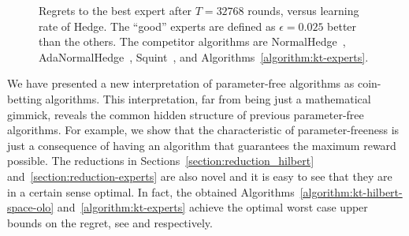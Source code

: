 \begin{figure}[t]
\centering
{}
\caption{\footnotesize{Regrets to the best expert after $T = 32768$ rounds, versus learning rate of Hedge. The ``good'' experts are defined as $\epsilon=0.025$ better than the others. The competitor algorithms are NormalHedge~\cite{Chaudhuri-Freund-Hsu-2009}, AdaNormalHedge~\cite{Luo-Schapire-2015}, Squint~\cite{Koolen-van-Erven-2015}, and Algorithms~\ref{algorithm:kt-experts}.}}
\label{fig:exp_lea}
\end{figure}

We have presented a new interpretation of parameter-free algorithms as coin-betting algorithms. This interpretation, far from being just a mathematical gimmick, reveals
the common hidden structure of previous parameter-free algorithms. For example,
we show that the characteristic of parameter-freeness is just a consequence of
having an algorithm that guarantees the maximum reward possible.
The reductions in Sections~\ref{section:reduction_hilbert} and~\ref{section:reduction-experts} are also novel and it is easy to see that they are in a
certain sense optimal. In fact, the obtained
Algorithms~\ref{algorithm:kt-hilbert-space-olo} and~\ref{algorithm:kt-experts}
achieve the optimal worst case upper bounds on the regret, see \cite{Streeter-McMahan-2012,Orabona-2013}
and \cite{Cesa-Bianchi-Lugosi-2006} respectively.


